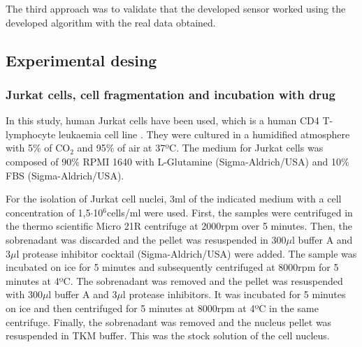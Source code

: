 \documentclass[12pt, a4paper]{article} %
\begin{document}
The third approach was to validate that the developed sensor worked using the developed algorithm with the real data obtained. 

\setlength{\parskip}{0mm}

\subsection{Experimental desing}

\subsubsection{Jurkat cells, cell fragmentation and incubation with drug}

In this study, human Jurkat cells have been used,  which is a human CD4 T-lymphocyte leukaemia cell line \cite{schneider1977characterization}. They were cultured in a humidified atmosphere with 5\% of CO$_{2}$ and 95\% of air at 37ºC. The medium for Jurkat cells was composed of 90\% RPMI 1640 with L-Glutamine (Sigma-Aldrich/USA) and 10\% FBS (Sigma-Aldrich/USA).

\setlength{\parskip}{4mm}

For the isolation of Jurkat cell nuclei, 3ml of the indicated medium with a cell concentration of 1,5$\cdot$10$^6$cells/ml were used. First, the samples were centrifuged in the thermo scientific Micro 21R centrifuge at 2000rpm over 5 minutes. Then, the sobrenadant was discarded and the pellet was resuspended in 300$\mu$l buffer A and 3$\mu$l protease inhibitor cocktail (Sigma-Aldrich/USA) were added. The sample was incubated on ice for 5 minutes and subsequently centrifuged at 8000rpm for 5 minutes at 4ºC. The sobrenadant was removed and the pellet was resuspended with 300$\mu$l buffer A and 3$\mu$l protease inhibitors. It was incubated for 5 minutes on ice and then centrifuged for 5 minutes at 8000rpm at 4ºC in the same centrifuge. Finally, the sobrenadant was removed and the nucleus pellet was resuspended in TKM buffer. This was the stock solution of the cell nucleus.
\end{document}
